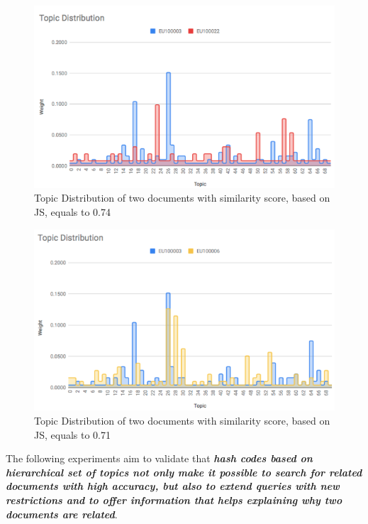 \begin{figure}[!htb]\centering
  \center
  \includegraphics[scale=0.45]{doc-similarity-pair1.png}
  \caption{Topic Distribution of two documents with similarity score, based on JS, equals to 0.74}
  \label{fig:doc_sim_1}
\end{figure}

\begin{figure}[!htb]\centering
  \center
  \includegraphics[scale=0.45]{doc-similarity-pair2.png}
  \caption{Topic Distribution of two documents with similarity score, based on JS, equals to 0.71}
  \label{fig:doc_sim_2}
\end{figure}

The following experiments aim to validate that \textit{\textbf{hash codes based on hierarchical set of topics not only make it possible to search for related documents with high accuracy, but also to extend queries with new restrictions and to offer information that helps explaining why two documents are related}}.


